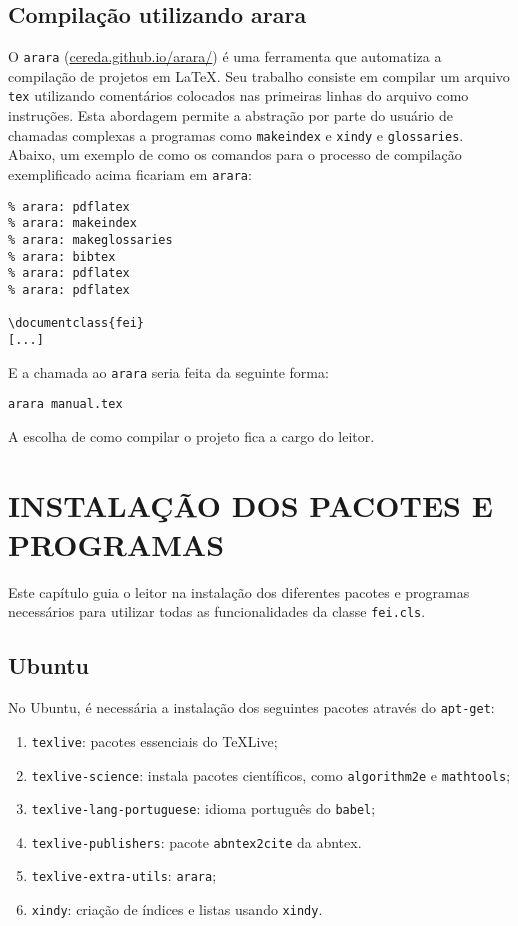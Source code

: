 \documentclass{fei}
\begin{document}
	\section{Compilação utilizando arara}
	
	O \texttt{arara} (\url{cereda.github.io/arara/}) é uma ferramenta que automatiza a compilação de projetos em \index{\LaTeX}\LaTeX. Seu trabalho consiste em compilar um arquivo \texttt{tex} utilizando comentários colocados nas primeiras linhas do arquivo como instruções. Esta abordagem permite a abstração por parte do usuário de chamadas complexas a programas como \texttt{makeindex} e \texttt{xindy} e \texttt{glossaries}. Abaixo, um exemplo de como os comandos para o processo de compilação exemplificado acima ficariam em \texttt{arara}:
	
	\begin{verbatim}
% arara: pdflatex
% arara: makeindex
% arara: makeglossaries
% arara: bibtex
% arara: pdflatex
% arara: pdflatex

\documentclass{fei}
[...]
	\end{verbatim}
	
	E a chamada ao \texttt{arara} seria feita da seguinte forma:
	
	\texttt{arara manual.tex}
	
	A escolha de como compilar o projeto fica a cargo do leitor.	
	
	\chapter{INSTALAÇÃO DOS PACOTES E PROGRAMAS}	\label{chap:instalacao}
	
	Este capítulo guia o leitor na instalação dos diferentes pacotes e programas necessários para utilizar todas as funcionalidades da classe \texttt{fei.cls}.
	
	\section{Ubuntu}
	
	No Ubuntu, é necessária a instalação dos seguintes pacotes através do \texttt{apt-get}:
	
	\begin{enumerate}
	\item \texttt{texlive}: pacotes essenciais do \TeX Live;
	\item \texttt{texlive-science}: instala pacotes científicos, como \texttt{algorithm2e} e \texttt{mathtools};
	\item \texttt{texlive-lang-portuguese}: idioma português do \texttt{babel};
	\item \texttt{texlive-publishers}: pacote \texttt{abntex2cite} da \gls{abntex}.
	\item \texttt{texlive-extra-utils}: \texttt{arara};
	\item \texttt{xindy}: criação de índices e listas usando \texttt{xindy}.
	\end{enumerate}
	

	\indice
	
\end{document}
